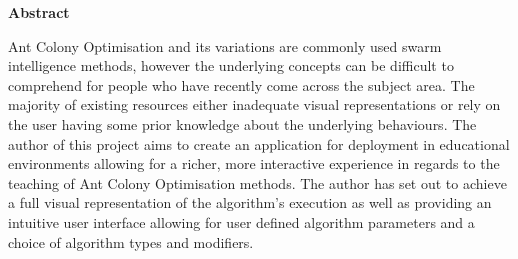 \thispagestyle{empty}

\begin{center}
    {\LARGE\bf Abstract}
\end{center}
Ant Colony Optimisation and its variations are commonly used swarm intelligence methods, however the underlying concepts can be difficult to comprehend for people who have recently come across the subject area. The majority of existing resources either inadequate visual representations or rely on the user having some prior knowledge about the underlying behaviours. The author of this project aims to create an application for deployment in educational environments allowing for a richer, more interactive experience in regards to the teaching of Ant Colony Optimisation methods. The author has set out to achieve a full visual representation of the algorithm's execution as well as providing an intuitive user interface allowing for user defined algorithm parameters and a choice of algorithm types and modifiers.

